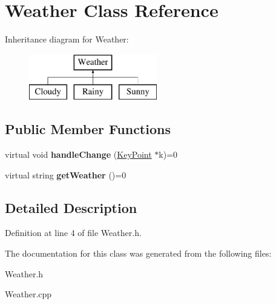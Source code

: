 \hypertarget{classWeather}{}\section{Weather Class Reference}
\label{classWeather}
Inheritance diagram for Weather\+:\begin{figure}[H]
\begin{center}
\leavevmode
\includegraphics[height=2.000000cm]{classWeather}
\end{center}
\end{figure}
\subsection*{Public Member Functions}
\begin{DoxyCompactItemize}
\item 
\mbox{\label{classWeather_af697ebc3ce0db3c7c6bc9b45854114e7}} 
virtual void {\bfseries handle\+Change} (\hyperlink{classKeyPoint}{Key\+Point} $\ast$k)=0
\item 
\mbox{\label{classWeather_ad7209dc331c4acdcdf7f17a94212eccb}} 
virtual string {\bfseries get\+Weather} ()=0
\end{DoxyCompactItemize}


\subsection{Detailed Description}


Definition at line 4 of file Weather.\+h.



The documentation for this class was generated from the following files\+:\begin{DoxyCompactItemize}
\item 
Weather.\+h\item 
Weather.\+cpp\end{DoxyCompactItemize}
